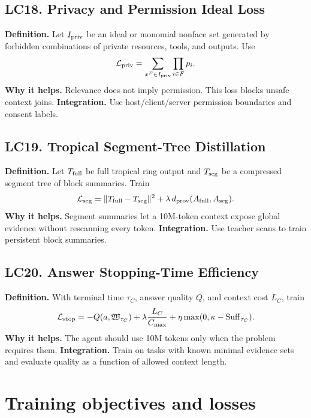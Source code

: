\documentclass[11pt]{article}
\newcommand{\loss}{\mathcal{L}}
\numberwithin{equation}{section}
\begin{document}
\subsection{LC18. Privacy and Permission Ideal Loss}
\textbf{Definition.} Let $I_{\rm priv}$ be an ideal or monomial nonface set generated by forbidden combinations of private resources, tools, and outputs. Use
\begin{equation}
\loss_{\rm priv}=\sum_{x^F\in I_{\rm priv}}\prod_{i\in F}p_i.
\end{equation}
\textbf{Why it helps.} Relevance does not imply permission. This loss blocks unsafe context joins. \textbf{Integration.} Use host/client/server permission boundaries and consent labels.

\subsection{LC19. Tropical Segment-Tree Distillation}
\textbf{Definition.} Let $T_{\rm full}$ be full tropical ring output and $T_{\rm seg}$ be a compressed segment tree of block summaries. Train
\begin{equation}
\loss_{\rm seg}=\|T_{\rm full}-T_{\rm seg}\|^2+\lambda\,d_{\rm prov}(A_{\rm full},A_{\rm seg}).
\end{equation}
\textbf{Why it helps.} Segment summaries let a 10M-token context expose global evidence without rescanning every token. \textbf{Integration.} Use teacher scans to train persistent block summaries.

\subsection{LC20. Answer Stopping-Time Efficiency}
\textbf{Definition.} With terminal time $\tau_C$, answer quality $Q$, and context cost $L_C$, train
\begin{equation}
\loss_{\rm stop}= -Q(a,\mathfrak{W}_{\tau_C})+\lambda\frac{L_C}{C_{\max}}+\eta\max(0,\kappa-\operatorname{Suff}_{\tau_C}).
\end{equation}
\textbf{Why it helps.} The agent should use 10M tokens only when the problem requires them. \textbf{Integration.} Train on tasks with known minimal evidence sets and evaluate quality as a function of allowed context length.

\section{Training objectives and losses}
\end{document}
